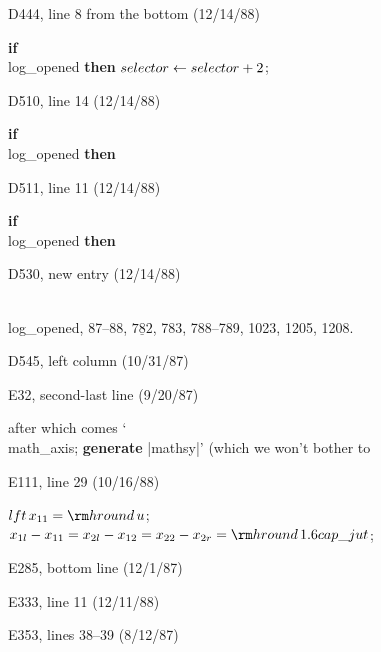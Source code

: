 \bugonpage D444, line 8 from the bottom (12/14/88)

\ninepoint\noindent\kern10pt
{\bf if\/} \\{log\_opened} {\bf then} $\\{selector}\gets\\{selector}+2$;

\bugonpage D510, line 14 (12/14/88)

\ninepoint\noindent\kern10pt
{\bf if\/} \\{log\_opened} {\bf then}

\bugonpage D511, line 11 (12/14/88)

\ninepoint\noindent\kern10pt
{\bf if\/} \\{log\_opened} {\bf then}

\bugonpage D530, new entry (12/14/88)

\eightpoint\noindent
\\{log\_opened}, 87--88, $\underline{782}$, 783, 788--789, 1023, 1205, 1208.

\bugonpage D545, left column (10/31/87)

\eightpoint
{}

\hsize=29pc
\def\dashto{\mathrel{\hbox{-\kern-.05em}\mkern3.9mu\hbox{-\kern-.05em}}}

\bugonpage E32, second-last line (9/20/87)

\tenpoint\noindent
after which comes `\\{math\_axis}\0; {\bf generate} |mathsy|' (which we
won't bother to\cutpar

\bugonpage E111, line 29 (10/16/88)

\ninepoint\noindent
$\\{lft}\,x_{11}={\rm hround}\,u$; \
 $x_{1l}-x_{11}=x_{2l}-x_{12}=x_{22}-x_{2r}={\rm hround}\,1.6\\{cap\_jut}$;

\bugonpage E285, bottom line (12/1/87)


\bugonpage E333, line 11 (12/11/88)

\ninepoint
{}

\bugonpage E353, lines 38--39 (8/12/87)

